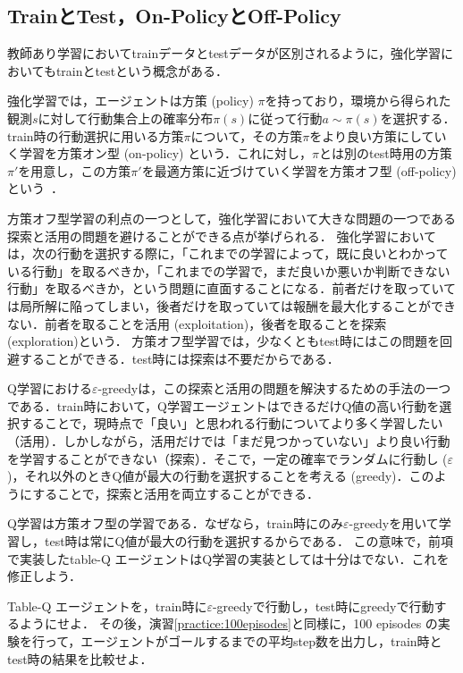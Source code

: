   \subsection{TrainとTest，On-PolicyとOff-Policy}
  教師あり学習においてtrainデータとtestデータが区別されるように，強化学習においてもtrainとtestという概念がある．

  強化学習では，エージェントは方策 (policy) $\pi$を持っており，環境から得られた観測$s$に対して行動集合上の確率分布$\pi(s)$に従って行動$a\sim \pi(s)$を選択する．
  train時の行動選択に用いる方策$\pi$について，その方策$\pi$をより良い方策にしていく学習を方策オン型 (on-policy) という．これに対し，$\pi$とは別のtest時用の方策$\pi'$を用意し，この方策$\pi'$を最適方策に近づけていく学習を方策オフ型 (off-policy) という~\cite{david2017policy}．

  方策オフ型学習の利点の一つとして，強化学習において大きな問題の一つである探索と活用の問題を避けることができる点が挙げられる．
  強化学習においては，次の行動を選択する際に，「これまでの学習によって，既に良いとわかっている行動」を取るべきか，「これまでの学習で，まだ良いか悪いか判断できない行動」を取るべきか，という問題に直面することになる．前者だけを取っていては局所解に陥ってしまい，後者だけを取っていては報酬を最大化することができない．前者を取ることを活用 (exploitation)，後者を取ることを探索 (exploration)という．
  方策オフ型学習では，少なくともtest時にはこの問題を回避することができる．test時には探索は不要だからである．

  Q学習における$\varepsilon$-greedyは，この探索と活用の問題を解決するための手法の一つである．train時において，Q学習エージェントはできるだけQ値の高い行動を選択することで，現時点で「良い」と思われる行動についてより多く学習したい（活用）．しかしながら，活用だけでは「まだ見つかっていない」より良い行動を学習することができない（探索）．そこで，一定の確率でランダムに行動し ($\varepsilon$)，それ以外のときQ値が最大の行動を選択することを考える (greedy)．このようにすることで，探索と活用を両立することができる．

  Q学習は方策オフ型の学習である．なぜなら，train時にのみ$\varepsilon$-greedyを用いて学習し，test時は常にQ値が最大の行動を選択するからである．
  この意味で，前項で実装したtable-Q エージェントはQ学習の実装としては十分はでない．これを修正しよう．

  \begin{practice}
   Table-Q エージェントを，train時に$\varepsilon$-greedyで行動し，test時にgreedyで行動するようにせよ．
   その後，演習\ref{practice:100episodes}と同様に，100 episodes の実験を行って，エージェントがゴールするまでの平均step数を出力し，train時とtest時の結果を比較せよ．
  \end{practice}

